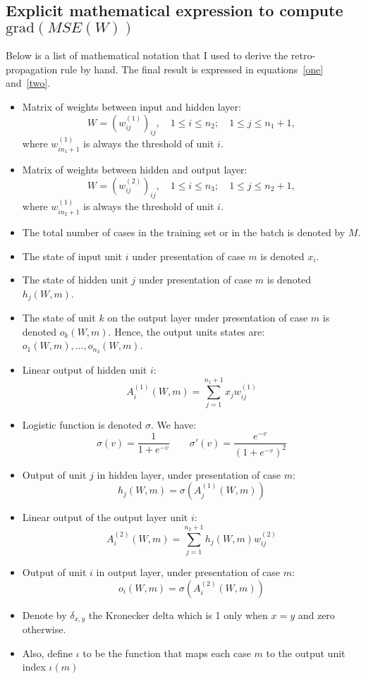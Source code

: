 \documentclass{article}
\newcommand{\lp}{\left(}
\newcommand{\rp}{\right)}
\begin{document}
\subsection*{{\color{blue}Explicit mathematical expression to compute $\text{grad}(MSE(W))$}}
Below is a list of mathematical notation that I used to derive the retro-propagation rule by hand.
The final result is expressed in equations~\eqref{one} and~\eqref{two}.
\begin{itemize}
\item Matrix of weights between input and hidden layer:
\[
W=\left(w_{ij}^{(1)}\right)_{ij}, \quad 1\leq i\leq n_2; \quad1\leq j \leq n_1+1,
\]
where $w_{in_1+1}^{(1)}$ is always the threshold of unit $i$.
\item Matrix of weights between hidden and output layer:
\[
W=\left(w_{ij}^{(2)}\right)_{ij}, \quad 1\leq i\leq n_3; \quad1\leq j \leq n_2+1,
\]
where $w_{in_2+1}^{(1)}$ is always the threshold of unit $i$.
\item The total number of cases in the training set or in the batch is denoted by $M$.
\item The state of input unit $i$ under presentation of case $m$ is denoted $x_i$. 
\item The state of hidden unit $j$ under presentation of case $m$ is denoted $h_j(W,m)$.
\item The state of unit $k$ on the output layer under presentation of case $m$ is denoted $o_k(W,m)$.
Hence, the output units states are: $o_1(W,m),\ldots,o_{n_3}(W,m)$.
\item Linear output of hidden unit $i$:
\[
A_i^{(1)}(W,m)=\sum_{j=1}^{n_1+1}x_jw_{ij}^{(1)}
\]
\item Logistic function is denoted $\sigma$. We have:
\[
\sigma(v)=\frac{1}{1+e^{-v}}\qquad \sigma'(v)=\frac{e^{-v}}{\lp1+e^{-v}\rp^2}
\]
\item Output of unit $j$ in hidden layer, under presentation of case $m$:
\[
h_j(W,m)=\sigma\lp A_j^{(1)}(W,m) \rp
\]
\item Linear output of the output layer unit $i$:
\[
A_i^{(2)}(W,m)=\sum_{j=1}^{n_2+1}h_j(W,m)w_{ij}^{(2)}
\]
\item Output of unit $i$ in output layer, under presentation of case $m$:
\[
o_i(W,m)=\sigma\lp A_i^{(2)}(W,m) \rp
\]
\item Denote by $\delta_{x,y}$ the Kronecker delta which is 1 only when $x=y$ and zero otherwise.
\item Also, define $\iota$ to be the function that maps each case $m$ to the output unit index $\iota(m)$

\end{itemize}
\end{document}
